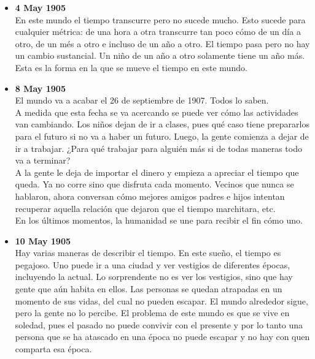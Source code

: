 \documentclass[12pt,a4paper]{report}
\begin{document}
\begin{itemize}
{\begin{itemize}[label=$\bullet$]
{            manera distinta a la que estamos acostumbrados?\\
            Los científicos no tienen prestigio, pues sus predicciónes se han
            vuelto descripciones. \\
            En este mundo, la gente vive sin temer por las consecuencias que sus
            acciones puedan traer en el futuro, pues esas consecuencias ya
            sucedieron.
        }
        \item{\textbf{4 May 1905}\\
            En este mundo el tiempo transcurre pero no sucede mucho. Esto sucede
            para cualquier métrica: de una hora a otra transcurre tan poco cómo
            de un día a otro, de un més a otro e incluso de un año a otro. El
            tiempo pasa pero no hay un cambio sustancial. Un niño de un año a
            otro solamente tiene un año más. Esta es la forma en la que se mueve
            el tiempo en este mundo.
        }
        \item{\textbf{8 May 1905}\\
            El mundo va a acabar el 26 de septiembre de 1907. Todos lo saben.\\
            A medida que esta fecha se va acercando se puede ver cómo las
            actividades van cambiando. Los niños dejan de ir a clases, pues qué
            caso tiene prepararlos para el futuro si no va a haber un futuro.
            Luego, la gente comienza a dejar de ir a trabajar. ¿Para qué
            trabajar para alguién más si de todas maneras todo va a terminar?\\
            A la gente le deja de importar el dinero y empieza a apreciar el
            tiempo que queda. Ya no corre sino que disfruta cada momento.
            Vecinos que nunca se hablaron, ahora conversan cómo mejores amigos
            padres e hijos intentan recuperar aquella relación que dejaron que
            el tiempo marchitara, etc.\\
            En los últimos momentos, la humanidad se une para recibir el fin
            cómo uno.
        }
        \item{\textbf{10 May 1905}\\
            Hay varias maneras de describir el tiempo. En este sueño, el tiempo
            es pegajoso. Uno puede ir a una ciudad y ver vestigios de diferentes
            épocas, incluyendo la actual. Lo sorprendente no es ver los
            vestigios, sino que hay gente que aún habita en ellos. Las personas
            se quedan atrapadas en un momento de sus vidas, del cual no pueden
            escapar. El mundo alrededor sigue, pero la gente no lo percibe. El
            problema de este mundo es que se vive en soledad, pues el pasado no
            puede convivir con el presente y por lo tanto una persona que se ha
            atascado en una época no puede escapar y no hay con quen comparta
            esa época.
        }
    \end{itemize}
}
\end{itemize}
\end{document}
